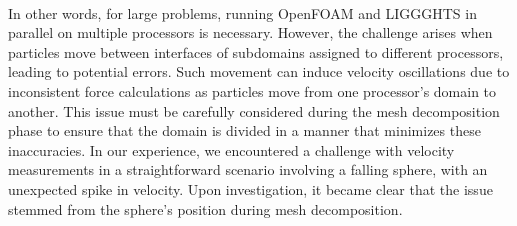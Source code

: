 In other words, for large problems, running OpenFOAM and LIGGGHTS\textsuperscript{\textregistered} in parallel on multiple processors is necessary. However, the challenge arises when particles move between interfaces of subdomains assigned to different processors, leading to potential errors. Such movement can induce velocity oscillations due to inconsistent force calculations as particles move from one processor's domain to another. This issue must be carefully considered during the mesh decomposition phase to ensure that the domain is divided in a manner that minimizes these inaccuracies. In our experience, we encountered a challenge with velocity measurements in a straightforward scenario involving a falling sphere, with an unexpected spike in velocity. Upon investigation, it became clear that the issue stemmed from the sphere's position during mesh decomposition. 
